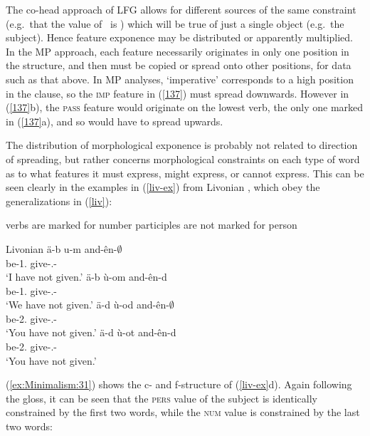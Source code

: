 \documentclass[output=paper,hidelinks]{langscibook}
\begin{document}
The co-head approach of LFG allows for different sources of the same
constraint (e.g.~that the value of \NUM\ is \SG) which will be
true of just a single object (e.g.~the subject). Hence feature
exponence may be distributed or apparently multiplied. In the MP
approach, each feature necessarily originates in only one position in
the structure, and then must be copied or spread onto other positions,
for data such as that above. In MP analyses, `imperative' corresponds
to a high position in the clause, so the \textsc{imp} feature in
(\ref{137}) must spread downwards. However in (\ref{137}b), the
\textsc{pass} feature would originate on the lowest verb, the only one
marked in (\ref{137}a), and so would have to spread upwards.

The distribution of morphological exponence is probably not related to
direction of spreading, but rather concerns morphological constraints
on each type of word as to what features it must express, might
express, or cannot express. This can be seen clearly in the examples
in (\ref{liv-ex}) from Livonian \citep[131]{Nino1997}, which obey the
generalizations in (\ref{liv}):

\ea\label{liv}\ea
verbs are marked for number
\ex
participles are not marked for person
\z\z

\ea\label{liv-ex} Livonian
\ea
\gll \"a-b u-m and-\^en-{$\emptyset$}\\
 be-1.{\SG} give-\PST.\PTCP-{\SG}\\
\glt `I have not given.'
\ex
\gll \"a-b \`u-om and-\^en-d\\
 be-1.{\PL} give-\PST.\PTCP-{\PL}\\
\glt `We have not given.'
\ex
\gll \"a-d \`u-od and-\^en-{$\emptyset$}\\
 be-2.{\SG} give-\PST.\PTCP-{\SG}\\
\glt `You have not given.'
\ex
\gll \"a-d \`u-ot and-\^en-d\\
 be-2.{\PL} give-\PST.\PTCP-{\PL}\\
\glt `You have not given.'
\z\z

(\ref{ex:Minimalism:31}) shows the c- and f-structure of (\ref{liv-ex}d). Again following
the gloss, it can be seen that the \textsc{pers} value of the subject
is identically constrained by the first two words, while the
\textsc{num} value is constrained by the last two words:
\end{document}
